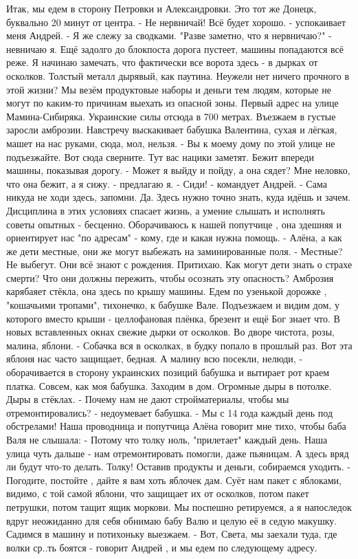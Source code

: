 Итак, мы едем в сторону Петровки и Александровки. Это тот же Донецк, буквально 20 минут от центра. 
- Не нервничай! Всё будет хорошо. - успокаивает меня Андрей. - Я же слежу за сводками. 
"Разве заметно, что я нервничаю?" - невничаю я. 
Ещё задолго до блокпоста дорога пустеет, машины попадаются всё реже.  Я начинаю замечать, что фактически все ворота здесь - в дырках от осколков. Толстый металл дырявый, как паутина. Неужели нет ничего прочного в этой жизни?
Мы везём продуктовые наборы и деньги тем людям, которые не могут по каким-то причинам выехать из опасной зоны. 
Первый адрес на улице  Мамина-Сибиряка. Украинские силы отсюда в 700 метрах. Въезжаем в густые заросли амброзии. Навстречу выскакивает бабушка Валентина, сухая и лёгкая, машет на нас руками, сюда, мол, нельзя. 
- Вы к моему дому по этой улице не подъезжайте. Вот сюда сверните. Тут вас нацики заметят. 
Бежит впереди машины, показывая дорогу. 
- Может я выйду и пойду, а она сядет? Мне неловко, что она бежит, а я сижу. - предлагаю я.
- Сиди! - командует Андрей. - Сама никуда не ходи здесь, запомни. 
Да. Здесь нужно точно знать, куда идёшь и зачем. Дисциплина в этих условиях спасает жизнь, а умение слышать и исполнять советы опытных - бесценно. 
Оборачиваюсь к нашей попутчице , она здешняя и ориентирует нас "по адресам" - кому, где и какая нужна помощь.
- Алёна, а как же дети местные, они же могут выбежать на заминированные поля. 
- Местные? Не выбегут. Они всё знают с рождения.
Притихаю. Как могут дети знать о страхе смерти? Что они должны пережить, чтобы осознать эту опасность?
Амброзия карябаяет стёкла, она здесь по крышу машины. Едем по узенькой дорожке , "кошачьими тропами", тихонечко,  к бабушке Вале. 
Подъезжаем и видим дом, у которого вместо крыши - целлофановая плёнка, брезент и ещё Бог знает что. В новых вставленных окнах свежие дырки от осколков. Во дворе чистота, розы, малина, яблони. 
- Собачка вся в осколках, в будку попало в прошлый раз. Вот эта яблоня нас часто защищает, бедная. А малину всю посекли, нелюди, - оборачивается в сторону украинских позиций бабушка и вытирает рот краем платка. Совсем, как моя бабушка. 
Заходим в дом. Огромные дыры в потолке. Дыры в стёклах. 
- Почему нам не дают стройматериалы, чтобы мы отремонтировались? - недоумевает бабушка. - Мы с 14 года каждый день под обстрелами!
Наша проводница и попутчица Алёна говорит мне тихо, чтобы баба Валя не слышала:
- Потому что толку ноль, "прилетает" каждый день. Наша улица чуть дальше - нам отремонтировать помогли, даже пьяницам. А здесь вряд ли будут что-то делать. Толку!
Оставив продукты и деньги, собираемся уходить. 
- Погодите, постойте , дайте я вам хоть яблочек дам. Суёт нам пакет с яблоками, видимо, с той самой яблони, что защищает их от осколков, потом пакет петрушки, потом тащит ящик моркови. 
Мы поспешно ретируемся, а я напоследок вдруг неожиданно для себя обнимаю бабу Валю и целую её в седую макушку. 
Садимся в машину и потихоньку выезжаем.
- Вот, Света, мы заехали туда, где волки ср..ть боятся - говорит Андрей , и мы едем по следующему адресу.
